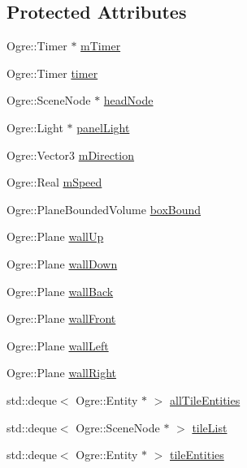 \subsection*{Protected Attributes}
\begin{DoxyCompactItemize}
\item 
Ogre\-::\-Timer $\ast$ \hyperlink{classTileGame_a51e31f23bb041d24e36d0cacac89bfef}{m\-Timer}
\item 
Ogre\-::\-Timer \hyperlink{classTileGame_adbfc142c4bd14007f4aec65b164bbea7}{timer}
\item 
Ogre\-::\-Scene\-Node $\ast$ \hyperlink{classTileGame_abea2ef2d450d7813d7faab4f8a3a8af6}{head\-Node}
\item 
Ogre\-::\-Light $\ast$ \hyperlink{classTileGame_a23db72b0263e4d5595c1f170cc312185}{panel\-Light}
\item 
Ogre\-::\-Vector3 \hyperlink{classTileGame_a3ce67ed5bc51aa139c087e1bdd5b7fe0}{m\-Direction}
\item 
Ogre\-::\-Real \hyperlink{classTileGame_a247769c14e679af78f5d877510e3b7ca}{m\-Speed}
\item 
Ogre\-::\-Plane\-Bounded\-Volume \hyperlink{classTileGame_a421f8bc0f90cf4acfa209bef5447e5eb}{box\-Bound}
\item 
Ogre\-::\-Plane \hyperlink{classTileGame_a3679e7a4d3981c56c087f23f94b3b0ec}{wall\-Up}
\item 
Ogre\-::\-Plane \hyperlink{classTileGame_af1834b17a2460b1613d93be25492113c}{wall\-Down}
\item 
Ogre\-::\-Plane \hyperlink{classTileGame_a3c37c43bfc4c0387a3f29f783e4f436a}{wall\-Back}
\item 
Ogre\-::\-Plane \hyperlink{classTileGame_a97846181582b43470f0a1394e0dfcad8}{wall\-Front}
\item 
Ogre\-::\-Plane \hyperlink{classTileGame_a92cc3d1944d2bd572198479508722577}{wall\-Left}
\item 
Ogre\-::\-Plane \hyperlink{classTileGame_ae7de21d4feafcb1cc6f2d0434ddcfa9c}{wall\-Right}
\item 
std\-::deque$<$ Ogre\-::\-Entity $\ast$ $>$ \hyperlink{classTileGame_a0308b658e89712b0dfbe5998495f9cec}{all\-Tile\-Entities}
\item 
std\-::deque$<$ Ogre\-::\-Scene\-Node $\ast$ $>$ \hyperlink{classTileGame_ad9bec31020eaa7dc719d8e9b8af20ee2}{tile\-List}
\item 
std\-::deque$<$ Ogre\-::\-Entity $\ast$ $>$ \hyperlink{classTileGame_aad2a30c885c91193d0a6da18f1477de5}{tile\-Entities}
\item 

\end{DoxyCompactItemize}
